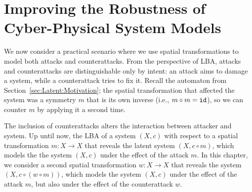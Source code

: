  \chapter{Improving the Robustness of Cyber-Physical System Models}
 \label{ch:CPSRobustness}  
 
 We now consider a practical scenario where we use spatial transformations to model both attacks and counterattacks. From the perspective of LBA, attacks and counterattacks are distinguishable only by intent: an attack aims to damage a system, while a counterattack tries to fix it. Recall the automaton from Section~\ref{sec:Latent:Motivation}; the spatial transformation that affected the system was a symmetry $m$ that is its own inverse (i.e., $m\circ m={\texttt{id}}$), so we can counter $m$ by applying it a second time. 
 
 The inclusion of counterattacks alters the interaction between attacker and system. Up until now, the LBA of a system $(X,c)$ with respect to a spatial transformation $m\colon X\rightarrow X$ that reveals the latent system $(X,c\circ m)$, which models the the system $(X,c)$ under the effect of the attack $m$. In this chapter, we consider a second spatial transformation $w\colon X\rightarrow X$ that reveals the system $(X, c\circ (w\circ m))$, which models the system $(X,c)$ under the effect of the attack $m$, but also under the effect of the counterattack $w$.

   
   
